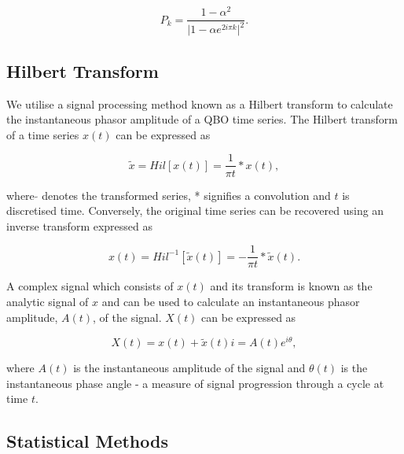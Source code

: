 \begin{equation} \label{theoretical_fourier}
P_k = \frac{1 - \alpha^2}{\vert 1 - \alpha e^{2i\pi k} \vert^2}.
\end{equation}

\subsection{Hilbert Transform}
We utilise a signal processing method known as a Hilbert transform to calculate the instantaneous phasor amplitude of a QBO time series. The Hilbert transform of a time series $x(t)$ can be expressed as

\begin{equation} \label{eq:hilbert1}
\tilde{x} = Hil[x(t)] = \frac{1}{\pi t} * x(t),
\end{equation}

where $\tilde{}$ denotes the transformed series, * signifies a convolution and $t$ is discretised time. Conversely, the original time series can be recovered using an inverse transform expressed as

\begin{equation} \label{eq:hilbert2}
{x(t)} = Hil^{-1}[\tilde{x}(t)] = -\frac{1}{\pi t} * \tilde{x}(t).
\end{equation}

A complex signal which consists of $x(t)$ and its transform is known as the analytic signal of $x$ and can be used to calculate an instantaneous phasor amplitude, $A(t)$, of the signal. $X(t)$ can be expressed as

\begin{equation} \label{eq:hilbert3}
X(t) = x(t) + \tilde{x}(t) i = A(t) e^{i\theta},
\end{equation}

where $A(t)$ is the instantaneous amplitude of the signal and $\theta(t)$ is the instantaneous phase angle - a measure of signal progression through a cycle at time $t$.

\subsection{Statistical Methods}
\label{sec:stat_tests}

